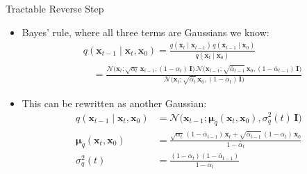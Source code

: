 \documentclass[11pt,compress,t,notes=noshow, xcolor=table]{beamer}
\providecommand{\bx}{\mathbf{x}}
\begin{document}
\begin{frame}{Tractable Reverse Step}

\vfill

\begin{itemize}
\item Bayes' rule, where all three terms are Gaussians we know:
{\small
\begin{align*}
&q(\bx_{t-1} \mid \bx_t, \bx_0) = \frac{q(\bx_t \mid \bx_{t-1})\, q(\bx_{t-1} \mid \bx_0)}{q(\bx_t \mid \bx_0)}\\
&\quad = \frac{\mathcal{N}\big(\bx_t; \sqrt{\alpha_t}\, \bx_{t-1}, (1 - \alpha_t)\, \mathbf{I}\big)\, \mathcal{N}\big(\bx_{t-1}; \sqrt{\bar{\alpha}_{t-1}}\, \bx_0, (1 - \bar{\alpha}_{t-1})\, \mathbf{I}\big)}{\mathcal{N}\big(\bx_t; \sqrt{\bar{\alpha}_t}\, \bx_0, (1 - \bar{\alpha}_t)\, \mathbf{I}\big)}
\end{align*}
}
\item This can be rewritten as another Gaussian:
\begin{align*}
q(\bx_{t-1} \mid \bx_t, \bx_0) &= \mathcal{N}\big(\bx_{t-1}; \boldsymbol{\mu}_q(\bx_t, \bx_0), \sigma_q^2(t)\, \mathbf{I}\big)\\
\boldsymbol{\mu}_q(\bx_t, \bx_0) &= \frac{\sqrt{\alpha_t}\,(1 - \bar{\alpha}_{t-1})\, \bx_t + \sqrt{\bar{\alpha}_{t-1}}\,(1 - \alpha_t)\, \bx_0}{1 - \bar{\alpha}_t}\\
\sigma_q^2(t) &= \frac{(1 - \alpha_t)(1 - \bar{\alpha}_{t-1})}{1 - \bar{\alpha}_t}
\end{align*}
\end{itemize}

\vfill

\end{frame}
\end{document}
